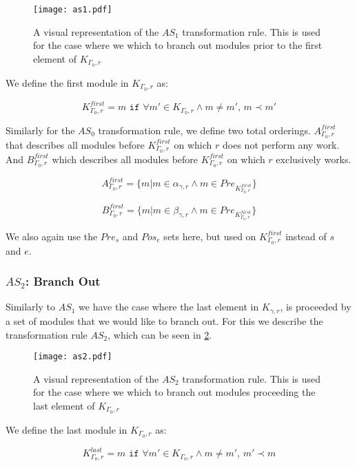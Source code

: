 \begin{figure}[H]
	\centering
	\texttt{[image: as1.pdf]}
	\caption{A visual representation of the $AS_1$ transformation rule. This is used for the case where we which to branch out modules prior to the first element of $K_{\Gamma_0 ,r}$}
	\label{fig:as1}
\end{figure}


 We define the first module in $K_{\Gamma_0 ,r}$ as:

\[K_{\Gamma_0 ,r}^{first} = m \texttt{ if } \forall m' \in K_{\Gamma_0 ,r} \land m \neq m',\, m \prec m' \] 

Similarly for the $AS_0$ transformation rule, we define two total orderings. $A_{\Gamma_0 ,r}^{first}$ that describes all modules before $K_{\Gamma_0 ,r}^{first}$ on which $r$ does not perform any work. And $B_{\Gamma_0 ,r}^{first}$ which describes all modules before $K_{\Gamma_0 ,r}^{first}$ on which $r$ exclusively works.

\[ A_{\Gamma_0 ,r}^{first} = \{m | m \in \alpha_{\gamma ,r}  \land m \in Pre_{K_{\Gamma_0 ,r}^{first}
	} \} \]

\[ B_{\Gamma_0 ,r}^{first} = \{m | m \in \beta_{\gamma ,r}  \land m \in Pre_{K_{\Gamma_0 ,r}^{first}} \} \]

We also again use the $Pre_s$ and $Pos_e$ sets here, but used on $K_{\Gamma_0 ,r}^{first}$ instead of $s$ and $e$.
  

\subsubsection{$AS_2$: Branch Out}
Similarly to $AS_1$ we have the case where the last element in $K_{\gamma ,r}$, is proceeded by a set of modules that we would like to branch out. For this we describe the transformation rule $AS_2$, which can be seen in \cref{fig:as2}.

\begin{figure}[H]
	\centering
	\texttt{[image: as2.pdf]}
	\caption{A visual representation of the $AS_2$ transformation rule. This is used for the case where we which to branch out modules proceeding the last element of $K_{\Gamma_0 ,r}$}
	\label{fig:as2}
\end{figure}


We define the last module in $K_{\Gamma_0 ,r}$ as:

\[K_{\Gamma_0 ,r}^{last} = m \texttt{ if } \forall m' \in K_{\Gamma_0 ,r} \land m \neq m',\, m' \prec m \] 


